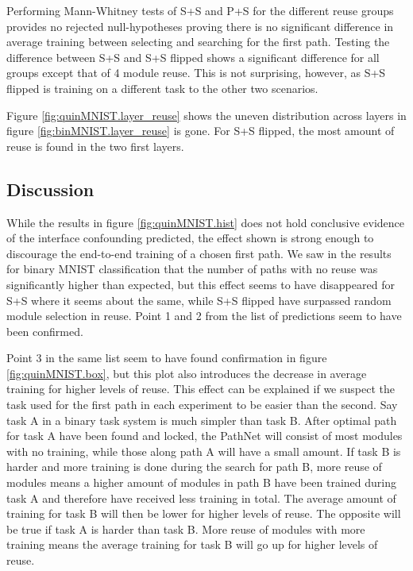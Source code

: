 Performing Mann-Whitney tests of S+S and P+S for the different reuse groups provides no rejected null-hypotheses proving there is no significant difference in average training between selecting and searching for the first path. Testing the difference between S+S and S+S flipped shows a significant difference for all groups except that of 4 module reuse. This is not surprising, however, as S+S flipped is training on a different task to the other two scenarios.

Figure \ref{fig:quinMNIST.layer_reuse} shows the uneven distribution across layers in figure \ref{fig:binMNIST.layer_reuse} is gone. For S+S flipped, the most amount of reuse is found in the two first layers.

\subsection{Discussion}
While the results in figure \ref{fig:quinMNIST.hist} does not hold conclusive evidence of the interface confounding predicted, the effect shown is strong enough to discourage the end-to-end training of a chosen first path. We saw in the results for binary MNIST classification that the number of paths with no reuse was significantly higher than expected, but this effect seems to have disappeared for S+S where it seems about the same, while S+S flipped have surpassed random module selection in reuse. Point 1 and 2 from the list of predictions seem to have been confirmed. 

Point 3 in the same list seem to have found confirmation in figure \ref{fig:quinMNIST.box}, but this plot also introduces the decrease in average training for higher levels of reuse. This effect can be explained if we suspect the task used for the first path in each experiment to be easier than the second. Say task A in a binary task system is much simpler than task B. After optimal path for task A have been found and locked, the PathNet will consist of most modules with no training, while those along path A will have a small amount. If task B is harder and more training is done during the search for path B, more reuse of modules means a higher amount of modules in path B have been trained during task A and therefore have received less training in total. The average amount of training for task B will then be lower for higher levels of reuse. 
The opposite will be true if task A is harder than task B. More reuse of modules with more training means the average training for task B will go up for higher levels of reuse. 

